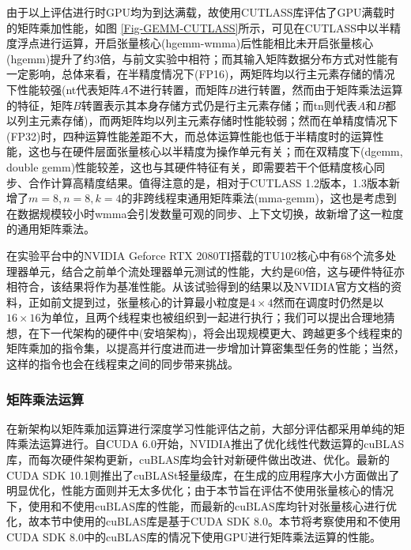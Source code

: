 \par 由于以上评估进行时GPU均为到达满载，故使用CUTLASS库评估了GPU满载时的矩阵乘加性能，如图 \ref{Fig-GEMM-CUTLASS}所示，可见在CUTLASS中以半精度浮点进行运算，开启张量核心(hgemm-wmma)后性能相比未开启张量核心(hgemm)提升了约3倍，与前文实验中相符；而其输入矩阵数据分布方式对性能有一定影响，总体来看，在半精度情况下(FP16)，两矩阵均以行主元素存储的情况下性能较强(nt代表矩阵$ A $不进行转置，而矩阵$ B $进行转置，然而由于矩阵乘法运算的特征，矩阵$ B $转置表示其本身存储方式仍是行主元素存储；而tn则代表$ A $和$ B $都以列主元素存储)，而两矩阵均以列主元素存储时性能较弱；然而在单精度情况下(FP32)时，四种运算性能差距不大，而总体运算性能也低于半精度时的运算性能，这也与在硬件层面张量核心以半精度为操作单元有关；而在双精度下(dgemm, double gemm)性能较差，这也与其硬件特征有关，即需要若干个低精度核心同步、合作计算高精度结果。值得注意的是，相对于CUTLASS 1.2版本，1.3版本新增了$ m=8,n=8,k=4 $的非跨线程束通用矩阵乘法(mma-gemm)，这也是考虑到在数据规模较小时wmma会引发数量可观的同步、上下文切换，故新增了这一粒度的通用矩阵乘法。
\par 在实验平台中的NVIDIA Geforce RTX 2080TI搭载的TU102核心中有68个流多处理器单元\cite{2080TI}，结合之前单个流处理器单元测试的性能，大约是60倍，这与硬件特征亦相符合，该结果将作为基准性能。从该试验得到的结果以及NVIDIA官方文档的资料，正如前文提到过，张量核心的计算最小粒度是$ 4\times 4 $然而在调度时仍然是以$ 16\times 16 $为单位，且两个线程束也被组织到一起进行执行；我们可以提出合理地猜想，在下一代架构的硬件中(安培架构)，将会出现规模更大、跨越更多个线程束的矩阵乘加的指令集，以提高并行度进而进一步增加计算密集型任务的性能；当然，这样的指令也会在线程束之间的同步带来挑战。

\subsubsection{矩阵乘法运算}
\par 在新架构以矩阵乘加运算进行深度学习性能评估之前，大部分评估都采用单纯的矩阵乘法运算进行。自CUDA 6.0开始，NVIDIA推出了优化线性代数运算的cuBLAS库，而每次硬件架构更新，cuBLAS库均会针对新硬件做出改进、优化。最新的CUDA SDK 10.1则推出了cuBLASt轻量级库，在生成的应用程序大小方面做出了明显优化，性能方面则并无太多优化；由于本节旨在评估不使用张量核心的情况下，使用和不使用cuBLAS库的性能，而最新的cuBLAS库均针对张量核心进行优化，故本节中使用的cuBLAS库是基于CUDA SDK 8.0。本节将考察使用和不使用CUDA SDK 8.0中的cuBLAS库的情况下使用GPU进行矩阵乘法运算的性能。
